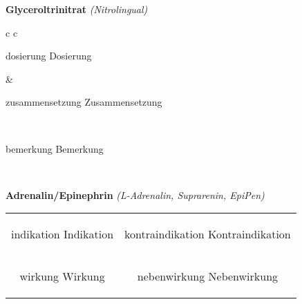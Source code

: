 \documentclass[12pt]{beamer}
\begin{document}
\begin{frame}{
    \textbf{Glyceroltrinitrat}
    \textit{(Nitrolingual)}
}
    \begin{tabular}{c c}
        \begin{beamercolorbox}[wd=\boxwidth\textwidth,ht=\boxheight\textheight,sep=1em]{dosierung}
        Dosierung
        \end{beamercolorbox} & 
        \begin{beamercolorbox}[wd=\boxwidth\textwidth,ht=\boxheight\textheight,sep=1em]{zusammensetzung}
        Zusammensetzung
        \end{beamercolorbox} \\
        \begin{beamercolorbox}[wd=\textwidth,ht=\boxheight\textheight,sep=1em]{bemerkung}
        Bemerkung
        \end{beamercolorbox} \\
    \end{tabular}
\end{frame}

\begin{frame}{
    \textbf{Adrenalin/Epinephrin}
    \textit{(L-Adrenalin, Suprarenin, EpiPen)}
}
    \begin{tabular}{c c}
        \begin{beamercolorbox}[wd=\boxwidth\textwidth,ht=\boxheight\textheight,sep=1em]{indikation}
        Indikation
        \end{beamercolorbox} & 
        \begin{beamercolorbox}[wd=\boxwidth\textwidth,ht=\boxheight\textheight,sep=1em]{kontraindikation}
        Kontraindikation 
        \end{beamercolorbox} \\
        \begin{beamercolorbox}[wd=\boxwidth\textwidth,ht=\boxheight\textheight,sep=1em]{wirkung}
        Wirkung
        \end{beamercolorbox} & 
        \begin{beamercolorbox}[wd=\boxwidth\textwidth,ht=\boxheight\textheight,sep=1em]{nebenwirkung}
        Nebenwirkung
        \end{beamercolorbox} \\
    \end{tabular}
\end{frame}
\end{document}

